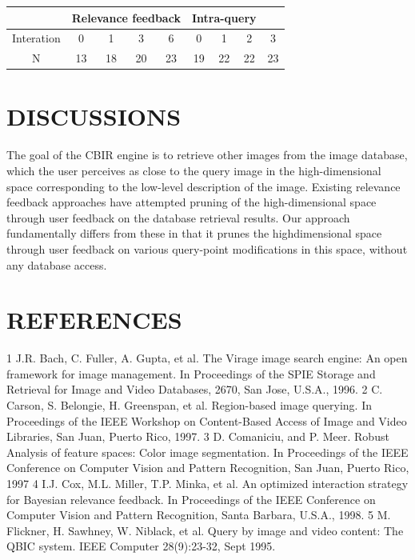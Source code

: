 \documentclass{article}
\begin{document}
    \begin{center}
    \begin{tabular}{|c|c|c|c|c|c|c|c|c|}
            
        
        \hline
         
         &\multicolumn{4}{c}{Relevance feedback}& \multicolumn{3}{c}{Intra-query } &\\
         \hline
       Interation & 0 &1 &3 &6 &0 &1 &2 &3 \\
       \hline
       N &13 &18 &20 &23 &19 &22 &22 &23 \\
       \hline
    \end{tabular}
    \label{tbl:1}
    \end{center}

\newpage
\newpage
{}
\section*{DISCUSSIONS}

The goal of the CBIR engine is to retrieve other images from the image database, which the user perceives as close to the query image in the high-dimensional space corresponding to the low-level description of the image. Existing relevance feedback approaches have attempted pruning of the high-dimensional space through user feedback on the database retrieval results. Our approach fundamentally differs from these in that it prunes the highdimensional space through user feedback on various query-point modifications in this space, without any database access.

\newpage
{}
\section*{REFERENCES}


1	J.R. Bach, C. Fuller, A. Gupta, et al. The Virage image search engine: An open framework for image management. In Proceedings of the SPIE Storage and Retrieval for Image and Video Databases, 2670, San Jose, U.S.A., 1996.
2	C. Carson, S. Belongie, H. Greenspan, et al. Region-based image querying. In Proceedings of the IEEE Workshop on Content-Based Access of Image and Video Libraries, San Juan, Puerto Rico, 1997.
3	D. Comaniciu, and P. Meer. Robust Analysis of feature spaces: Color image segmentation. In Proceedings of the IEEE Conference on Computer Vision and Pattern Recognition, San Juan, Puerto Rico, 1997
4	I.J. Cox, M.L. Miller, T.P. Minka, et al. An optimized interaction strategy for Bayesian relevance feedback. In Proceedings of the IEEE Conference on Computer Vision and Pattern Recognition, Santa Barbara, U.S.A., 1998.
5	M. Flickner, H. Sawhney, W. Niblack, et al. Query by image and video content: The QBIC system. IEEE Computer 28(9):23-32, Sept 1995.
\end{document}
